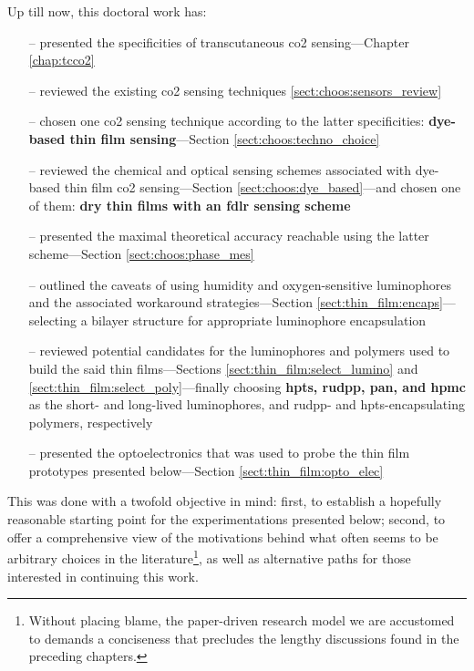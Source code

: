 Up till now, this doctoral work has:
\begin{enumerate}
	\item[--] presented the specificities of transcutaneous \gls{co2} sensing---Chapter \ref{chap:tcco2}
	\item[--] reviewed the existing \gls{co2} sensing techniques \ref{sect:choos:sensors_review}
	\item[--] chosen one \gls{co2} sensing technique according to the latter specificities: \textbf{dye-based thin film sensing}---Section \ref{sect:choos:techno_choice}
	\item[--] reviewed the chemical and optical sensing schemes associated with dye-based thin film \gls{co2} sensing---Section \ref{sect:choos:dye_based}---and chosen one of them: \textbf{dry thin films with an \gls{fdlr} sensing scheme}
	\item[--] presented the maximal theoretical accuracy reachable using the latter scheme---Section \ref{sect:choos:phase_mes}
	\item[--] outlined the caveats of using humidity and oxygen-sensitive luminophores and the associated workaround strategies---Section \ref{sect:thin_film:encaps}---selecting a bilayer structure for appropriate luminophore encapsulation
	\item[--] reviewed potential candidates for the luminophores and polymers used to build the said thin films---Sections \ref{sect:thin_film:select_lumino} and \ref{sect:thin_film:select_poly}---finally choosing \textbf{\gls{hpts}, \gls{rudpp}, \gls{pan}, and \gls{hpmc}} as the short- and long-lived luminophores, and \gls{rudpp}- and \gls{hpts}-encapsulating polymers, respectively
	\item[--] presented the optoelectronics that was used to probe the thin film prototypes presented below---Section \ref{sect:thin_film:opto_elec}
\end{enumerate}
This was done with a twofold objective in mind: first, to establish a hopefully reasonable starting point for the experimentations presented below; second, to offer a comprehensive view of the motivations behind what often seems to be arbitrary choices in the literature\footnote{Without placing blame, the paper-driven research model we are accustomed to demands a conciseness that precludes the lengthy discussions found in the preceding chapters.}, as well as alternative paths for those interested in continuing this work.

